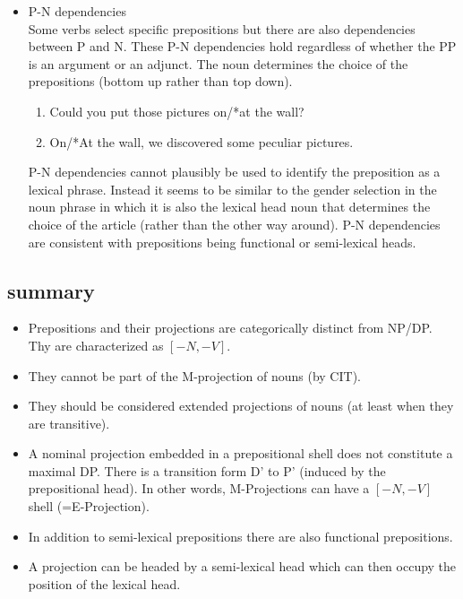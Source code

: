 \documentclass{article}
\begin{document}
\begin{itemize}
\begin{example}
\begin{enumerate}
   \glt
   \glend
\end{enumerate}
   \end{example}
\item P-N dependencies\\
Some verbs select specific prepositions but there are also dependencies between P and N. These P-N dependencies hold regardless of whether the PP is an argument or an adjunct. The noun determines the choice of the prepositions (bottom up rather than top down). 
\begin{example}
\label{}
\begin{enumerate}
\item Could you put those pictures on/*at the wall?
\item On/*At the wall, we discovered some peculiar pictures.
\end{enumerate}   
   \end{example}
P-N dependencies cannot plausibly be used to identify the preposition as a lexical phrase. Instead it seems to be similar to the gender selection in the noun phrase in which it is also the lexical head noun that determines the choice of the article (rather than the other way around). P-N dependencies are consistent with prepositions being functional or semi-lexical heads. 
\end{itemize}

\subsection{summary}
\begin{itemize}
\item Prepositions and their projections are categorically distinct from NP/DP. Thy are characterized as $[-N, -V]$.
\item They cannot be part of the M-projection of nouns (by CIT).
\item They should be considered extended projections of nouns (at least when they are transitive).
\item A nominal projection embedded in a prepositional shell does not constitute a maximal DP. There is a transition form D' to P' (induced by the prepositional head). In other words, M-Projections can have a $[-N, -V]$ shell (=E-Projection).
\item In addition to semi-lexical prepositions there are also functional prepositions.
\item A projection can be headed by a semi-lexical head which can then occupy the position of the lexical head.
\end{itemize}
\end{document}
